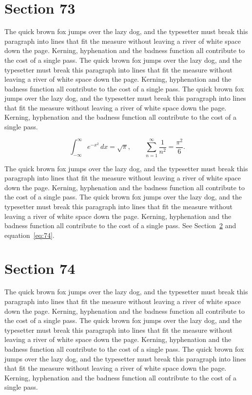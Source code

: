 \documentclass{article}
\begin{document}
\section{Section 73}
\label{sec:73}
The quick brown fox jumps over the lazy dog, and the typesetter must break this paragraph into lines that fit the measure without leaving a river of white space down the page. Kerning, hyphenation and the badness function all contribute to the cost of a single pass. The quick brown fox jumps over the lazy dog, and the typesetter must break this paragraph into lines that fit the measure without leaving a river of white space down the page. Kerning, hyphenation and the badness function all contribute to the cost of a single pass. The quick brown fox jumps over the lazy dog, and the typesetter must break this paragraph into lines that fit the measure without leaving a river of white space down the page. Kerning, hyphenation and the badness function all contribute to the cost of a single pass. 

\begin{equation}\label{eq:73}
\int_{-\infty}^{\infty} e^{-x^{2}}\,dx = \sqrt{\pi}, \qquad
\sum_{n=1}^{\infty} \frac{1}{n^{2}} = \frac{\pi^{2}}{6}.
\end{equation}

The quick brown fox jumps over the lazy dog, and the typesetter must break this paragraph into lines that fit the measure without leaving a river of white space down the page. Kerning, hyphenation and the badness function all contribute to the cost of a single pass. The quick brown fox jumps over the lazy dog, and the typesetter must break this paragraph into lines that fit the measure without leaving a river of white space down the page. Kerning, hyphenation and the badness function all contribute to the cost of a single pass. 
See Section~\ref{sec:74} and equation~\eqref{eq:74}.
\section{Section 74}
\label{sec:74}
The quick brown fox jumps over the lazy dog, and the typesetter must break this paragraph into lines that fit the measure without leaving a river of white space down the page. Kerning, hyphenation and the badness function all contribute to the cost of a single pass. The quick brown fox jumps over the lazy dog, and the typesetter must break this paragraph into lines that fit the measure without leaving a river of white space down the page. Kerning, hyphenation and the badness function all contribute to the cost of a single pass. The quick brown fox jumps over the lazy dog, and the typesetter must break this paragraph into lines that fit the measure without leaving a river of white space down the page. Kerning, hyphenation and the badness function all contribute to the cost of a single pass. 
\end{document}
